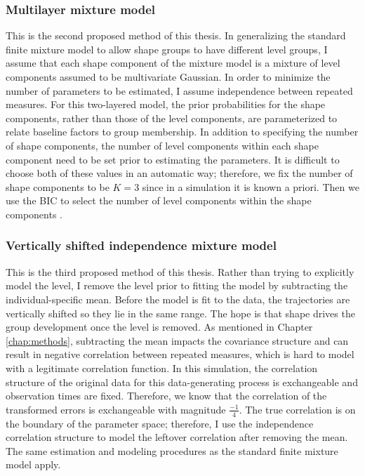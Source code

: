 \subsubsection{Multilayer mixture model}
This is the second proposed method of this thesis. In generalizing the standard finite mixture model to allow shape groups to have different level groups, I assume that each shape component of the mixture model is a mixture of level components assumed to be multivariate Gaussian. In order to minimize the number of parameters to be estimated, I assume independence between repeated measures. For this two-layered model, the prior probabilities for the shape components, rather than those of the level components, are parameterized to relate baseline factors to group membership. In addition to specifying the number of shape components, the number of level components within each shape component need to be set prior to estimating the parameters. It is difficult to choose both of these values in an automatic way; therefore, we fix the number of shape components to be $K=3$ since in a simulation it is known a priori. Then we use the BIC to select the number of level components within the shape components \cite{li2005}. 

\subsubsection{Vertically shifted independence mixture model}
This is the third proposed method of this thesis. Rather than trying to explicitly model the level, I remove the level prior to fitting the model by subtracting the individual-specific mean. Before the model is fit to the data, the trajectories are vertically shifted so they lie in the same range. The hope is that shape drives the group development once the level is removed. As mentioned in Chapter \ref{chap:methods}, subtracting the mean impacts the covariance structure and can result in negative correlation between repeated measures, which is hard to model with a legitimate correlation function. In this simulation, the correlation structure of the original data for this data-generating process is exchangeable and observation times are fixed. Therefore, we know that the correlation of the transformed errors is exchangeable with magnitude $\frac{-1}{4}$. The true correlation is on the boundary of the parameter space; therefore, I use the independence correlation structure to model the leftover correlation after removing the mean. The same estimation and modeling procedures as the standard finite mixture model apply.

